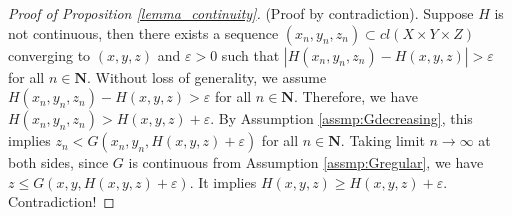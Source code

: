 \documentclass[a4paper, 11pt]{amsart}
\numberwithin{equation}{section}
\theoremstyle{plain}
\theoremstyle{definition}
\theoremstyle{remark}
\newcommand{\N}{\mathbf{N}}
\begin{document}
\vspace{0.3cm}
\begin{proof}[Proof of Proposition \ref{lemma_continuity}]
	(Proof by contradiction). Suppose $H$ is not continuous, then there exists a sequence ${(x_n, y_n, z_n)} \subset cl(X\times Y \times Z)$ converging to $(x, y, z)$ and $\varepsilon >0$ such that $|H(x_n, y_n, z_n) - H(x,y,z)|>\varepsilon$ for all $n\in \N$. Without loss of generality, we assume $H(x_n, y_n, z_n) - H(x,y,z)>\varepsilon$ for all $n\in \N$. Therefore, we have $H(x_n, y_n, z_n) > H(x,y,z)+\varepsilon$. By Assumption \ref{assmp:Gdecreasing}, this implies $z_n < G(x_n, y_n, H(x,y,z)+\varepsilon)$ for all $n\in \N$. Taking limit $n\longrightarrow \infty$ at both sides, since $G$ is continuous from Assumption \ref{assmp:Gregular}, we have $z \le G(x, y, H(x,y,z)+\varepsilon)$. It implies $H(x,y,z) \ge H(x,y,z)+\varepsilon$. Contradiction!
\end{proof}
\end{document}
